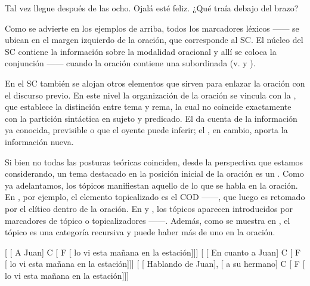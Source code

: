 \begin{exe}
  \ex\label{ex:06-talvez} Tal vez llegue después de las ocho.
  \ex\label{ex:06-ojala} Ojalá esté feliz.
  \ex\label{ex:06-quetraia} ¿Qué traía debajo del brazo?
\end{exe}

\begin{recuadro}
Como se advierte en los ejemplos de arriba, todos los marcadores léxicos
------ se ubican en el margen izquierdo de la
oración, que corresponde al SC. El núcleo del SC contiene la información sobre
la modalidad oracional y allí se coloca la conjunción ------
cuando la oración contiene una subordinada (v.  y
).

En el SC también se alojan otros elementos que sirven para enlazar la oración
con el discurso previo. En este nivel la organización de la oración se vincula
con la , que establece la distinción entre tema
y rema, la cual no coincide exactamente con la partición sintáctica en sujeto y
predicado. El  da cuenta de la información ya conocida, previsible
o que el oyente puede inferir; el , en cambio, aporta la
información nueva.

Si bien no todas las posturas teóricas coinciden, desde la perspectiva que
estamos considerando, un tema destacado en la posición inicial de la oración es
un . Como ya adelantamos, los tópicos manifiestan aquello de lo
que se habla en la oración. En , por ejemplo, el elemento
topicalizado es el COD ------, que luego es retomado por el
clítico  dentro de la oración. En  y
, los tópicos aparecen introducidos por marcadores de tópico o
topicalizadores ------. Además, como se muestra
en , el tópico es una categoría recursiva y puede haber más
de uno en la oración.

\begin{exe}
  \ex
    \begin{xlist}
      \ex\label{ex:06-top-a} {}[ [ A Juan] C [
          F [ lo vi esta mañana en la estación]]]
      \ex\label{ex:06-top-b} {}[ [ En cuanto a Juan] C
          [ F [ lo vi esta mañana en la
          estación]]]
      \ex\label{ex:06-top-c} {}[ [ Hablando de Juan],
          [ a su hermano] C [ F [
          lo vi esta mañana en la estación]]]
    \end{xlist}
\end{exe}


\end{recuadro}
